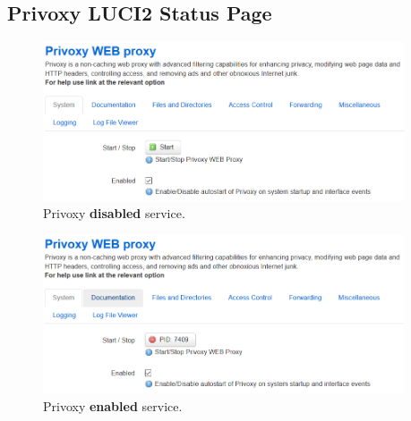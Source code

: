 \begin{appendices}
\section{Privoxy LUCI2 Status Page}
\begin{figure}[H]
    \centering
    \includegraphics[width=0.95\textwidth]{images/luciextra/disabled}
    \caption{Privoxy \textbf{disabled} service.}
    \label{fig:privdis}
\end{figure}

\begin{figure}[H]
    \centering
    \includegraphics[width=0.95\textwidth]{images/luciextra/enabled}
    \caption{Privoxy \textbf{enabled} service.}
    \label{fig:priven}
\end{figure}
\end{appendices}